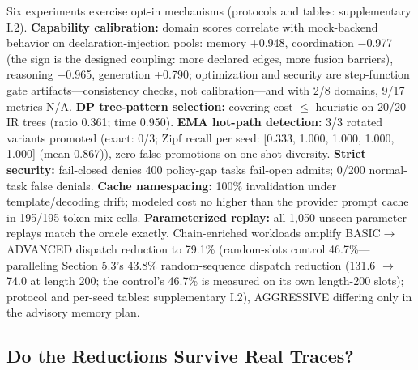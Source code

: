 \documentclass[
  sigconf,
  anonymous]{acmart}
\begin{document}
Six experiments exercise opt-in mechanisms (protocols and tables:
supplementary I.2). \textbf{Capability calibration:} domain scores
correlate with mock-backend behavior on declaration-injection pools:
memory +0.948, coordination −0.977 (the sign is the designed coupling:
more declared edges, more fusion barriers), reasoning −0.965, generation
+0.790; optimization and security are step-function gate
artifacts---consistency checks, not calibration---and with 2/8 domains,
9/17 metrics N/A. \textbf{DP tree-pattern selection:} covering cost
\(\leq\) heuristic on 20/20 IR trees (ratio 0.361; time 0.950).
\textbf{EMA hot-path detection:} 3/3 rotated variants promoted (exact:
0/3; Zipf recall per seed: {[}0.333, 1.000, 1.000, 1.000, 1.000{]} (mean
0.867)), zero false promotions on one-shot diversity. \textbf{Strict
security:} fail-closed denies 400 policy-gap tasks fail-open admits;
0/200 normal-task false denials. \textbf{Cache namespacing:} 100\%
invalidation under template/decoding drift; modeled cost no higher than
the provider prompt cache in 195/195 token-mix cells.
\textbf{Parameterized replay:} all 1,050 unseen-parameter replays match
the oracle exactly. Chain-enriched workloads amplify
BASIC\(\rightarrow\)ADVANCED dispatch reduction to 79.1\% (random-slots
control 46.7\%---paralleling Section 5.3's 43.8\% random-sequence
dispatch reduction (131.6 \(\rightarrow\) 74.0 at length 200; the
control's 46.7\% is measured on its own length-200 slots); protocol and
per-seed tables: supplementary I.2), AGGRESSIVE differing only in the
advisory memory plan.

\subsection{Do the Reductions Survive Real
Traces?}\label{do-the-reductions-survive-real-traces}
\end{document}
